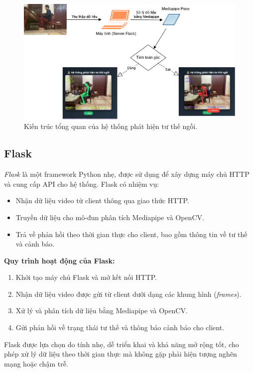 \documentclass[conference]{IEEEtran}
\begin{document}
\begin{figure}[h]
    \centering
    \includegraphics[width=0.9\linewidth]{images/system_architecture.png}
    \caption{Kiến trúc tổng quan của hệ thống phát hiện tư thế ngồi.}
    \label{fig:system_architecture}
\end{figure}

\subsection{Flask}
\textit{Flask} là một framework Python nhẹ, được sử dụng để xây dựng máy chủ HTTP và cung cấp API cho hệ thống. Flask có nhiệm vụ:
\begin{itemize}
    \item Nhận dữ liệu video từ client thông qua giao thức HTTP.
    \item Truyền dữ liệu cho mô-đun phân tích Mediapipe và OpenCV.
    \item Trả về phản hồi theo thời gian thực cho client, bao gồm thông tin về tư thế và cảnh báo.
\end{itemize}

\textbf{Quy trình hoạt động của Flask:}
\begin{enumerate}
    \item Khởi tạo máy chủ Flask và mở kết nối HTTP.
    \item Nhận dữ liệu video được gửi từ client dưới dạng các khung hình (\textit{frames}).
    \item Xử lý và phân tích dữ liệu bằng Mediapipe và OpenCV.
    \item Gửi phản hồi về trạng thái tư thế và thông báo cảnh báo cho client.
\end{enumerate}

Flask được lựa chọn do tính nhẹ, dễ triển khai và khả năng mở rộng tốt, cho phép xử lý dữ liệu theo thời gian thực mà không gặp phải hiện tượng nghẽn mạng hoặc chậm trễ.
\end{document}
